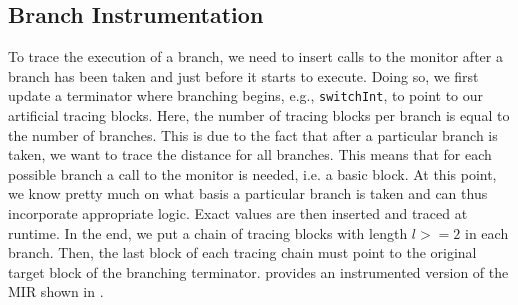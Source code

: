 \documentclass[paper=a4,%
  twoside,%
  BCOR4mm,%
  abstract=true,%
  toc=bibliography,%
  chapterprefix=true,%
  toc=bibliographynumbered,%
  open=right,%
  english,%
  pagesize=pdftex]{scrreprt}
\newcommand{\mir}{\ac{MIR}\xspace}
\begin{document}
\subsection{Branch Instrumentation}
To trace the execution of a branch, we need to insert calls to the monitor after a branch has been taken and just before it starts to execute. Doing so, we first update a terminator where branching begins, e.g., \texttt{switchInt}, to point to our artificial tracing blocks. Here, the number of tracing blocks per branch is equal to the number of branches. This is due to the fact that after a particular branch is taken, we want to trace the distance for all branches. This means that for each possible branch a call to the monitor is needed, i.e. a basic block. At this point, we know pretty much on what basis a particular branch is taken and can thus incorporate appropriate logic. Exact values are then inserted and traced at runtime. In the end, we put a chain of tracing blocks with length $l >= 2$ in each branch. Then, the last block of each tracing chain must point to the original target block of the branching terminator.  provides an instrumented version of the \mir shown in .
\end{document}
